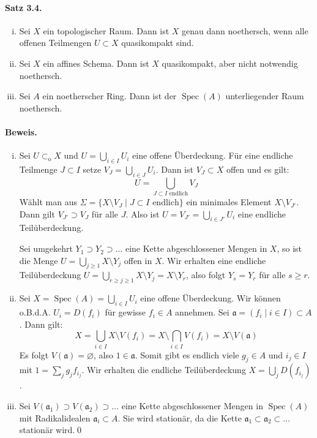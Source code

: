 \paragraph{Satz 3.4.}\label{3.4} \begin{enumerate}[(i)]
\item Sei $X$ ein topologischer Raum. Dann ist $X$ genau dann noethersch, wenn alle offenen Teilmengen $U\subset X$ quasikompakt sind.
\item Sei $X$ ein affines Schema. Dann ist $X$ quasikompakt, aber nicht notwendig noethersch.
\item Sei $A$ ein noetherscher Ring. Dann ist der $\operatorname{Spec}(A)$ unterliegender Raum noethersch.
\end{enumerate}

\paragraph{Beweis.}\begin{enumerate}[(i)]
\item Sei $U\subset_\text{o}X$ und $U=\bigcup_{i\in I}U_i$ eine offene Überdeckung. Für eine endliche Teilmenge $J\subset I$ setze $V_J=\bigcup_{i\in J}U_i$. Dann ist $V_J\subset X$ offen und es gilt:
\[U=\bigcup_{J\subset I\text{ endlich}}V_J \]
Wählt man aus $\Sigma=\{X\setminus V_J\mid J\subset I\text{ endlich}\}$ ein minimales Element $X\setminus V_{J'}$. Dann gilt $V_{J'}\supset V_J$ für alle $J$. Also ist $U=V_{J'}=\bigcup_{i\in J'}U_i$ eine endliche Teilüberdeckung.

Sei umgekehrt $Y_1\supset Y_2\supset\ldots$ eine Kette abgeschlossener Mengen in $X$, so ist die Menge $U=\bigcup_{j\geq 1}X\setminus Y_j$ offen in $X$. Wir erhalten eine endliche Teilüberdeckung $U=\bigcup_{r\geq j\geq 1}X\setminus Y_j=X\setminus Y_r$, also folgt $Y_s=Y_r$ für alle $s\geq r$.
\item Sei $X=\operatorname{Spec}(A)=\bigcup_{i\in I}U_i$ eine offene Überdeckung. Wir können o.B.d.A. $U_i=D(f_i)$ für gewisse $f_i\in A$ annehmen. Sei $\mathfrak{a}=(f_i\mid i\in I)\subset A$. Dann gilt:
\[X=\bigcup_{i\in I}X\setminus V(f_i) = X\setminus\bigcap_{i\in I}V(f_i)=X\setminus V(\mathfrak{a}) \]
Es folgt $V(\mathfrak{a})=\varnothing$, also $1\in\mathfrak{a}$. Somit gibt es endlich viele $g_j\in A$ und $i_j\in I$ mit $1=\sum_j g_jf_{i_j}$. Wir erhalten die endliche Teilüberdeckung $X=\bigcup_j D(f_{i_j})$.
\item Sei $V(\mathfrak{a}_1)\supset V(\mathfrak{a}_2)\supset\ldots$ eine Kette abgeschlossener Mengen in $\operatorname{Spec}(A)$ mit Ra\-di\-kal\-idealen $\mathfrak{a}_i\subset A$. Sie wird stationär, da die Kette $\mathfrak{a}_1\subset \mathfrak{a}_2\subset\ldots$ stationär wird.\qed
\end{enumerate}

